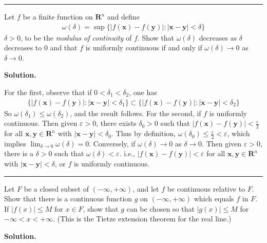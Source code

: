 \documentclass[12pt]{article}
\theoremstyle{definition}
\begin{document}
\bigskip\noindent\hrule\bigskip

Let $f$ be a finite function on $\mathbf{R}^n$ and define
\begin{align*}
\omega(\delta)
=\sup\{\left\vert f(\mathbf{x})-f(\mathbf{y})\right\vert:\left\vert \mathbf{x}-\mathbf{y}\right\vert<\delta\}
\end{align*}
$\delta>0$, to be the \textit{modulus of continuity} of $f$. Show that $\omega(\delta)$ decreases as $\delta$ decreases to $0$ and that $f$ is uniformly continuous if and only if $\omega(\delta)\to 0$ as $\delta\to 0$.

\smallskip
\noindent\textbf{Solution.}\quad

For the first, observe that if $0<\delta_1<\delta_2$, one has
\begin{align*}
\{\left\vert f(\mathbf{x})-f(\mathbf{y})\right\vert:\left\vert \mathbf{x}-\mathbf{y}\right\vert<\delta_1\}
\subset\{\left\vert f(\mathbf{x})-f(\mathbf{y})\right\vert:\left\vert \mathbf{x}-\mathbf{y}\right\vert<\delta_2\}
\end{align*}
So $\omega(\delta_1)\le\omega(\delta_2)$, and the result follows.
For the second, if $f$ is uniformly continuous. Then given $\varepsilon>0$, there exists $\delta_0>0$ such that $\left\vert f(\mathbf{x})-f(\mathbf{y})\right\vert<\frac{\varepsilon}{2}$ for all $\mathbf{x},\mathbf{y}\in\mathbf{R}^n$ with $\left\vert \mathbf{x}-\mathbf{y}\right\vert<\delta_0$. Thus by definition, $\omega(\delta_0)\le\frac{\varepsilon}{2}<\varepsilon$, which implies $\lim_{\delta\to 0}\omega(\delta)=0$. Conversely, if $\omega(\delta)\to 0$ as $\delta\to 0$. Then given $\varepsilon>0$, there is a $\delta>0$ such that $\omega(\delta)<\varepsilon$. i.e., $\left\vert f(\mathbf{x})-f(\mathbf{y})\right\vert<\varepsilon$ for all $\mathbf{x},\mathbf{y}\in\mathbf{R}^n$ with $\left\vert \mathbf{x}-\mathbf{y}\right\vert<\delta$, or $f$ is uniformly continuous.



\bigskip\noindent\hrule\bigskip

Let $F$ be a closed subset of $(-\infty,+\infty)$, and let $f$ be continuous relative to $F$. Show that there is a continuous function $g$ on $(-\infty,+\infty)$ which equals $f$ in $F$. If $\left\vert f(x)\right\vert\le M$ for $x\in F$, show that $g$ can be chosen so that $\left\vert g(x)\right\vert\le M$ for $-\infty<x<+\infty$. (This is the Tietze extension theorem for the real line.)

\smallskip
\noindent\textbf{Solution.}\quad
\end{document}
